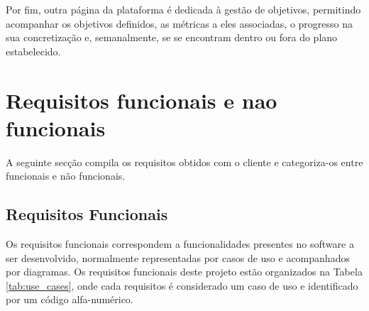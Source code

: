 Por fim, outra página da plataforma é dedicada à gestão de objetivos, permitindo acompanhar os objetivos definidos, as métricas a eles associadas, o progresso na sua concretização e, semanalmente, se se encontram dentro ou fora do plano estabelecido.

\section{Requisitos funcionais e nao funcionais}

A seguinte secção compila os requisitos obtidos com o cliente e categoriza-os entre funcionais e não funcionais.

\subsection{Requisitos Funcionais}

Os requisitos funcionais correspondem a funcionalidades presentes no software a ser desenvolvido, normalmente representadas por casos de uso e acompanhados por diagramas. Os requisitos funcionais deste projeto estão organizados na Tabela \ref{tab:use_cases}, onde cada requisitos é considerado um caso de uso e identificado por um código alfa-numérico.

